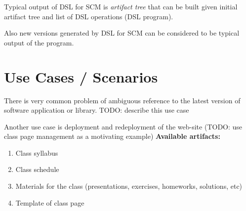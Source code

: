 \documentclass[11pt]{article}
\begin{document}

Typical output of DSL for SCM is \textit{artifact tree} that can be built given initial artifact tree and list of DSL operations (DSL program). 


Also new versions generated by DSL for SCM can be considered to be typical output of the program.



\section{Use Cases / Scenarios}
\label{sec:examples}


There is very common problem of ambiguous reference to the latest version of software application or library. TODO: describe this use case

Another use case is deployment and redeployment of the web-site (TODO: use class page management as a motivating example)
\textbf{Available artifacts:}
\begin{enumerate}
\item Class syllabus
\item Class schedule 
\item Materials for the class (presentations, exercises, homeworks, solutions, etc)
\item Template of class page
\end{enumerate}
\end{document}
